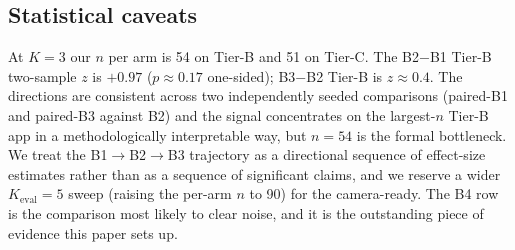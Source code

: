 \subsection{Statistical caveats}
\label{sec:eval-stat}

At $K{=}3$ our $n$ per arm is 54 on Tier-B and 51 on Tier-C. The B2$-$B1 Tier-B two-sample $z$ is $+0.97$ ($p \approx 0.17$ one-sided); B3$-$B2 Tier-B is $z \approx 0.4$. The directions are consistent across two independently seeded comparisons (paired-B1 and paired-B3 against B2) and the signal concentrates on the largest-$n$ Tier-B app in a methodologically interpretable way, but $n{=}54$ is the formal bottleneck. We treat the B1$\to$B2$\to$B3 trajectory as a directional sequence of effect-size estimates rather than as a sequence of significant claims, and we reserve a wider $K_{\text{eval}}{=}5$ sweep (raising the per-arm $n$ to 90) for the camera-ready. The B4 row is the comparison most likely to clear noise, and it is the outstanding piece of evidence this paper sets up.
